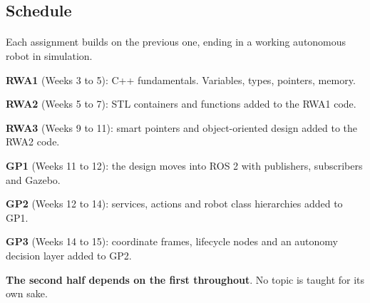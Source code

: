 \documentclass[
    10pt,
    dvipsnames,
    svgnames,
    x11names,
    aspectratio=1610,
    english,
    codeminted]{beamer}
\begin{document}
\subsection*{Schedule}
\begingroup
\divframetrue
\renewcommand{\divbartextA}{\secname}
\renewcommand{\divbartextB}{}
\begin{frame}{\secname}
  \divbar{\secname}{\subsecname}
  
  \framesubtitle{\subsecname}


Each assignment builds on the previous one, ending in a working autonomous robot in simulation.

\begin{compactitem}
\small
    \item \textbf{RWA1} (Weeks 3 to 5): C++ fundamentals. Variables, types, pointers, memory.
    \item \textbf{RWA2} (Weeks 5 to 7): STL containers and functions added to the RWA1 code.
    \item \textbf{RWA3} (Weeks 9 to 11): smart pointers and object-oriented design added to the RWA2 code.
    \item \textbf{GP1} (Weeks 11 to 12): the design moves into ROS 2 with publishers, subscribers and Gazebo.
    \item \textbf{GP2} (Weeks 12 to 14): services, actions and robot class hierarchies added to GP1.
    \item \textbf{GP3} (Weeks 14 to 15): coordinate frames, lifecycle nodes and an autonomy decision layer added to GP2.
\end{compactitem}

\medskip
\begin{MyBox}
\textbf{The second half depends on the first throughout}. No topic is taught for its own sake.
\end{MyBox}
\end{frame}
\endgroup
\end{document}
